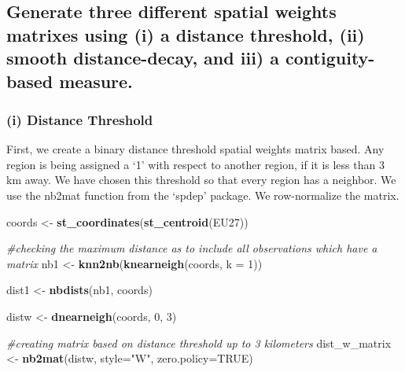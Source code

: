 \documentclass[
  a4paper,
]{article}
\newenvironment{Shaded}{\begin{snugshade}}{\end{snugshade}}
\newcommand{\AttributeTok}[1]{\textcolor[rgb]{0.13,0.29,0.53}{#1}}
\newcommand{\CommentTok}[1]{\textcolor[rgb]{0.56,0.35,0.01}{\textit{#1}}}
\newcommand{\ConstantTok}[1]{\textcolor[rgb]{0.56,0.35,0.01}{#1}}
\newcommand{\DecValTok}[1]{\textcolor[rgb]{0.00,0.00,0.81}{#1}}
\newcommand{\FunctionTok}[1]{\textcolor[rgb]{0.13,0.29,0.53}{\textbf{#1}}}
\newcommand{\NormalTok}[1]{#1}
\newcommand{\OtherTok}[1]{\textcolor[rgb]{0.56,0.35,0.01}{#1}}
\newcommand{\StringTok}[1]{\textcolor[rgb]{0.31,0.60,0.02}{#1}}
\begin{document}
\hypertarget{generate-three-different-spatial-weights-matrixes-using-i-a-distance-threshold-ii-smooth-distance-decay-and-iii-a-contiguity-based-measure.}{%
\subsection{Generate three different spatial weights matrixes using (i)
a distance threshold, (ii) smooth distance-decay, and iii) a
contiguity-based
measure.}\label{generate-three-different-spatial-weights-matrixes-using-i-a-distance-threshold-ii-smooth-distance-decay-and-iii-a-contiguity-based-measure.}}

\hypertarget{i-distance-threshold}{%
\subsubsection{(i) Distance Threshold}\label{i-distance-threshold}}

First, we create a binary distance threshold spatial weights matrix
based. Any region is being assigned a `1' with respect to another
region, if it is less than 3 km away. We have chosen this threshold so
that every region has a neighbor. We use the nb2mat function from the
`spdep' package. We row-normalize the matrix.

\begin{Shaded}
\begin{Highlighting}[]
\NormalTok{coords }\OtherTok{\textless{}{-}} \FunctionTok{st\_coordinates}\NormalTok{(}\FunctionTok{st\_centroid}\NormalTok{(EU27))}

\CommentTok{\#checking the maximum distance as to include all observations which have a matrix   }
\NormalTok{nb1 }\OtherTok{\textless{}{-}} \FunctionTok{knn2nb}\NormalTok{(}\FunctionTok{knearneigh}\NormalTok{(coords, }\AttributeTok{k =} \DecValTok{1}\NormalTok{))}

\NormalTok{dist1 }\OtherTok{\textless{}{-}} \FunctionTok{nbdists}\NormalTok{(nb1, coords)}

\NormalTok{distw }\OtherTok{\textless{}{-}} \FunctionTok{dnearneigh}\NormalTok{(coords, }\DecValTok{0}\NormalTok{, }\DecValTok{3}\NormalTok{)}

\CommentTok{\#creating matrix based on distance threshold up to 3 kilometers}
\NormalTok{dist\_w\_matrix }\OtherTok{\textless{}{-}} \FunctionTok{nb2mat}\NormalTok{(distw, }\AttributeTok{style=}\StringTok{"W"}\NormalTok{, }\AttributeTok{zero.policy=}\ConstantTok{TRUE}\NormalTok{)}
\end{Highlighting}
\end{Shaded}
\end{document}
